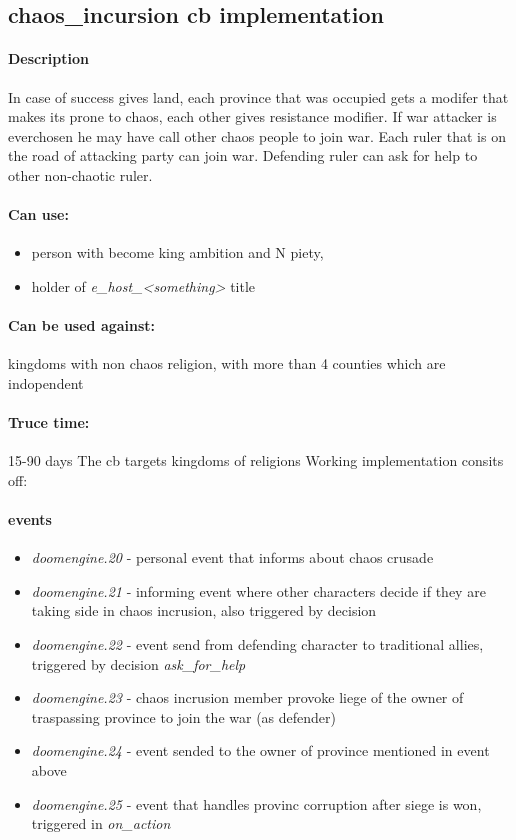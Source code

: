 \documentclass[10pt, english]{article}
\begin{document}
\newpage
\subsection{chaos\_incursion cb implementation}
\paragraph{Description}
In case of success gives land, each province that was occupied gets a modifer that 
makes its prone to chaos, each other gives resistance modifier.
If war attacker is everchosen he may have call other chaos  people to join war.
Each ruler that is on the road of attacking party can join war.
Defending ruler can ask for help to other non-chaotic ruler.
\paragraph{Can use:} 
\begin{itemize}
 \item person with become king ambition and N piety,
 \item holder of \textit{e\_host\_<something>}  title
\end{itemize}
\paragraph{Can be used against:}
kingdoms with non chaos religion, with more than 4 counties which are indopendent
\paragraph{Truce time:} 15-90 days
The cb targets kingdoms of religions 
Working implementation consits off:
\paragraph{events}
\begin{itemize}
\item \textit{doomengine.20} - personal event that informs about chaos crusade 
\item \textit{doomengine.21} - informing event where other characters decide
 if they are taking side in chaos incrusion, also triggered by decision
\item \textit{doomengine.22} - event send from defending character to traditional allies,
triggered by decision \textit{ask\_for\_help}
\item \textit{doomengine.23} - chaos incrusion member provoke liege of 
the owner of traspassing province to join the war (as defender)
\item \textit{doomengine.24} - event sended to the owner of province mentioned in event
above
\item \textit{doomengine.25} - event that handles provinc corruption after siege is won,
triggered in \textit{on\_action}
\end{itemize}
\end{document}
